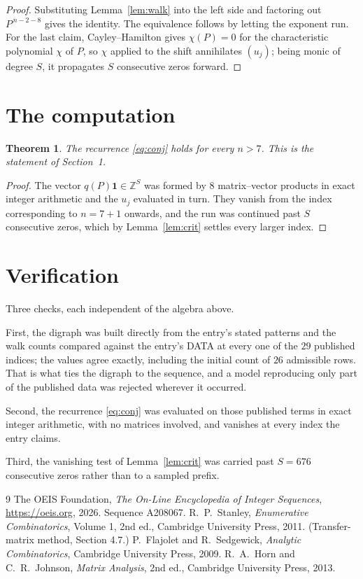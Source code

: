 \documentclass[11pt,a4paper]{article}
\theoremstyle{plain}
\newtheorem{theorem}{Theorem}
\theoremstyle{definition}
\begin{document}
\begin{proof}
Substituting Lemma~\ref{lem:walk} into the left side and factoring out
$P^{\,n-2-8}$ gives the identity. The equivalence follows by letting the exponent
run. For the last claim, Cayley--Hamilton gives $\chi(P)=0$ for the characteristic
polynomial $\chi$ of $P$, so $\chi$ applied to the shift annihilates $(u_j)$; being monic of
degree $S$, it propagates $S$ consecutive zeros forward.
\end{proof}

\section{The computation}

\begin{theorem}
The recurrence \eqref{eq:conj} holds for every $n>7$. This is the statement of
Section~1.
\end{theorem}

\begin{proof}
The vector $q(P)\mathbf{1}\in\mathbb{Z}^{S}$ was formed by $8$ matrix--vector
products in exact integer arithmetic and the $u_j$ evaluated in turn. They vanish from the
index corresponding to $n=7+1$ onwards, and the run was continued past $S$ consecutive
zeros, which by Lemma~\ref{lem:crit} settles every larger index.
\end{proof}

\section{Verification}

Three checks, each independent of the algebra above.

First, the digraph was built directly from the entry's stated patterns and the walk counts
compared against the entry's DATA at every one of the $29$ published indices; the
values agree exactly, including the initial count of $26$ admissible rows. That is
what ties the digraph to the sequence, and a model reproducing only part of the published
data was rejected wherever it occurred.

Second, the recurrence \eqref{eq:conj} was evaluated on those published terms in exact
integer arithmetic, with no matrices involved, and vanishes at every index the entry claims.

Third, the vanishing test of Lemma~\ref{lem:crit} was carried past $S=676$ consecutive
zeros rather than to a sampled prefix.

\begin{thebibliography}{9}
 The OEIS Foundation, \emph{The On-Line Encyclopedia of Integer
Sequences}, \url{https://oeis.org}, 2026. Sequence A208067.
 R.~P.~Stanley, \emph{Enumerative Combinatorics}, Volume 1, 2nd ed.,
Cambridge University Press, 2011. (Transfer-matrix method, Section 4.7.)
 P.~Flajolet and R.~Sedgewick, \emph{Analytic Combinatorics}, Cambridge
University Press, 2009.
 R.~A.~Horn and C.~R.~Johnson, \emph{Matrix Analysis}, 2nd ed., Cambridge
University Press, 2013.
\end{thebibliography}
\end{document}
